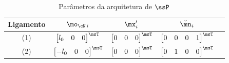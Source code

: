 \documentclass[]{politex}
\begin{document}
\begin{table}[H]
\begin{center}
\caption{Parâmetros da arquitetura de $\ssP$}
\begin{tabular}{|c|c|c|c|c|} 
	\hline
	\rule[-2mm]{0mm}{6mm}
	Ligamento & $\mo_{\cN\,i}$ & $\mx'_i$ & $\breve{\mn}_i$\\
	\hline
	\rule[-2mm]{0mm}{6mm}
	(1) & $\begin{bmatrix} l_0 & 0 & 0 \end{bmatrix}^\msT$ & $\begin{bmatrix} 0 & 0 & 0 \end{bmatrix}^\msT$ & $\begin{bmatrix} 0 & 0 & 0 & 1 \end{bmatrix}^\msT$ \\
	\rule[-1mm]{0mm}{5mm}
	(2) & $\begin{bmatrix} -l_0 & 0 & 0 \end{bmatrix}^\msT$ & $\begin{bmatrix} 0 & 0 & 0 \end{bmatrix}^\msT$ & $\begin{bmatrix} 0 & 1 & 0 & 0 \end{bmatrix}^\msT$ \\
	\hline
\end{tabular}
\label{tab:ArquiteturaParalelo}
\end{center}
\end{table}
\end{document}
